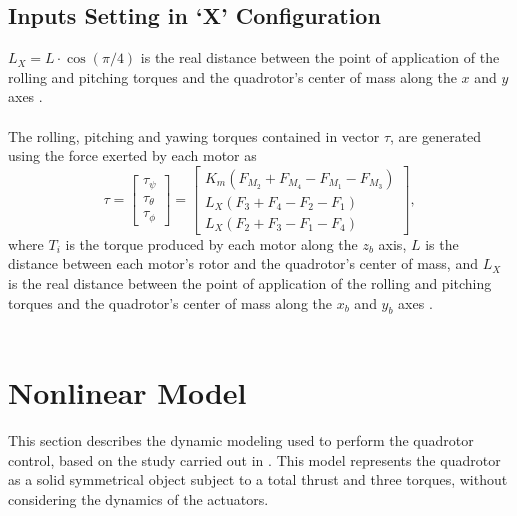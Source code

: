 \subsection{Inputs Setting in `X' Configuration}
$L_{X} = L\cdot \cos\left(\pi/4\right)$ is the real distance between the point of application of the rolling and pitching torques and the quadrotor's center of mass along the $x$ and $y$ axes \cite{Faessler2016}.
\\\\
The rolling, pitching and yawing torques contained in vector $\tau$, are generated using the force exerted by each motor as 
\begin{equation}
	\tau = \begin{bmatrix}
	\tau_{\psi}\\[5pt]
	\tau_{\theta}\\[5pt]
	\tau_{\phi}
	\end{bmatrix} = \begin{bmatrix}
								K_{m}(F_{M_2} + F_{M_4} - F_{M_1} - F_{M_3})\\[5pt]
								L_{X}(F_{3}+F_{4}-F_{2}-F_{1})\\[10pt]
								L_{X}(F_{2}+F_{3}-F_{1}-F_{4})
							\end{bmatrix},
	\label{ec:torques}						
\end{equation}
where $ T_{i} $ is the torque produced by each motor along the $z_{b}$ axis, $ L $ is the distance between each motor's rotor and the quadrotor's center of mass, and $L_X$ is the real distance between the point of application of the rolling and pitching torques and the quadrotor's center of mass along the $x_b$ and $y_b$ axes \cite{Faessler2016}.\\\\



\section{Nonlinear Model}
\label{sec:nonlinear}

This section describes the dynamic modeling used to perform the quadrotor control, based on the study carried out in \cite{modelamiento, modelamientoPDAFC, modelamientoNCQ}. This model represents the quadrotor as a solid symmetrical object subject to a total thrust and three torques, without considering the dynamics of the actuators.


